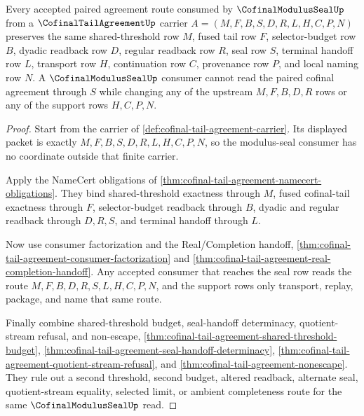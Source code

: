 \begin{theorem}
\label{thm:cofinal-tail-agreement-modulus-seal-route}
Every accepted paired agreement route consumed by $\CofinalModulusSealUp$ from a $\CofinalTailAgreementUp$ carrier $A=(M,F,B,S,D,R,L,H,C,P,N)$ preserves the same shared-threshold row $M$, fused tail row $F$, selector-budget row $B$, dyadic readback row $D$, regular readback row $R$, seal row $S$, terminal handoff row $L$, transport row $H$, continuation row $C$, provenance row $P$, and local naming row $N$. A $\CofinalModulusSealUp$ consumer cannot read the paired cofinal agreement through $S$ while changing any of the upstream $M,F,B,D,R$ rows or any of the support rows $H,C,P,N$.
\end{theorem}
\begin{proof}
Start from the carrier of \autoref{def:cofinal-tail-agreement-carrier}. Its displayed packet is exactly $M,F,B,S,D,R,L,H,C,P,N$, so the modulus-seal consumer has no coordinate outside that finite carrier.

Apply the NameCert obligations of \autoref{thm:cofinal-tail-agreement-namecert-obligations}. They bind shared-threshold exactness through $M$, fused cofinal-tail exactness through $F$, selector-budget readback through $B$, dyadic and regular readback through $D,R,S$, and terminal handoff through $L$.

Now use consumer factorization and the Real/Completion handoff, \autoref{thm:cofinal-tail-agreement-consumer-factorization} and \autoref{thm:cofinal-tail-agreement-real-completion-handoff}. Any accepted consumer that reaches the seal row reads the route $M,F,B,D,R,S,L,H,C,P,N$, and the support rows only transport, replay, package, and name that same route.

Finally combine shared-threshold budget, seal-handoff determinacy, quotient-stream refusal, and non-escape, \autoref{thm:cofinal-tail-agreement-shared-threshold-budget}, \autoref{thm:cofinal-tail-agreement-seal-handoff-determinacy}, \autoref{thm:cofinal-tail-agreement-quotient-stream-refusal}, and \autoref{thm:cofinal-tail-agreement-nonescape}. They rule out a second threshold, second budget, altered readback, alternate seal, quotient-stream equality, selected limit, or ambient completeness route for the same $\CofinalModulusSealUp$ read.
\end{proof}

